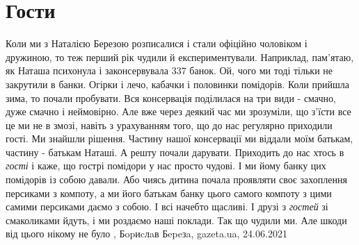  
 
 
 
 
\chapter{Гости}
\label{sec:slova.gosti}

Коли ми з Наталією Березою розписалися і стали офіційно чоловіком і дружиною,
то теж перший рік чудили й експериментували. Наприклад, пам'ятаю, як Наташа
психонула і законсервувала 337 банок. Ой, чого ми тоді тільки не закрутили в
банки. Огірки і лечо, кабачки і половинки помідорів. Коли прийшла зима, то
почали пробувати. Вся консервація поділилася на три види - смачно, дуже смачно
і неймовірно. Але вже через деякий час ми зрозуміли, що з'їсти все це ми не в
змозі, навіть з урахуванням того, що до нас регулярно приходили гості. Ми
знайшли рішення. Частину нашої консервації ми віддали моїм батькам, частину -
батькам Наташі. А решту почали дарувати. Приходить до нас хтось в \emph{гості} і каже,
що гострі помідори у нас просто чудові. І ми йому банку цих помідорів із собою
давали. Або чиясь дитина почала проявляти своє захоплення персиками з компоту,
а ми його батькам банку цього самого компоту з цими самими персиками даємо з
собою. І всі начебто щасливі. І друзі з \emph{гостей} зі смаколиками йдуть, і ми
роздаємо наші поклади. Так що чудили ми. Але шкоди від цього нікому не було
, 
Бopиcлaв Бepeзa, gazeta.ua, 24.06.2021
